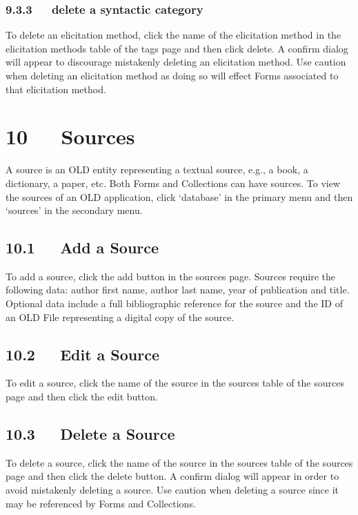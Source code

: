 \documentclass[letterpaper,10pt,english]{sphinxmanual}
\begin{document}
\subsection{9.3.3   delete a syntactic category}
\label{documentation:id21}
To delete an elicitation method, click the name of the elicitation method in the
elicitation methods table of the tags page and then click delete.  A confirm
dialog will appear to discourage mistakenly deleting an elicitation method.  Use
caution when deleting an elicitation method as doing so will effect Forms
associated to that elicitation method.


\chapter{10   Sources}
\label{documentation:sources}
A source is an OLD entity representing a textual source, e.g., a book, a
dictionary, a paper, etc.  Both Forms and Collections can have sources.  To view
the sources of an OLD application, click `database' in the primary menu and then
`sources' in the secondary menu.


\section{10.1   Add a Source}
\label{documentation:add-a-source}
To add a source, click the add button in the sources page.  Sources require the
following data: author first name, author last name, year of publication and
title.  Optional data include a full bibliographic reference for the source and
the ID of an OLD File representing a digital copy of the source.


\section{10.2   Edit a Source}
\label{documentation:edit-a-source}
To edit a source, click the name of the source in the sources table of the
sources page and then click the edit button.


\section{10.3   Delete a Source}
\label{documentation:delete-a-source}
To delete a source, click the name of the source in the sources table of the
sources page and then click the delete button.  A confirm dialog will appear in
order to avoid mistakenly deleting a source.  Use caution when deleting a source
since it may be referenced by Forms and Collections.
\end{document}
